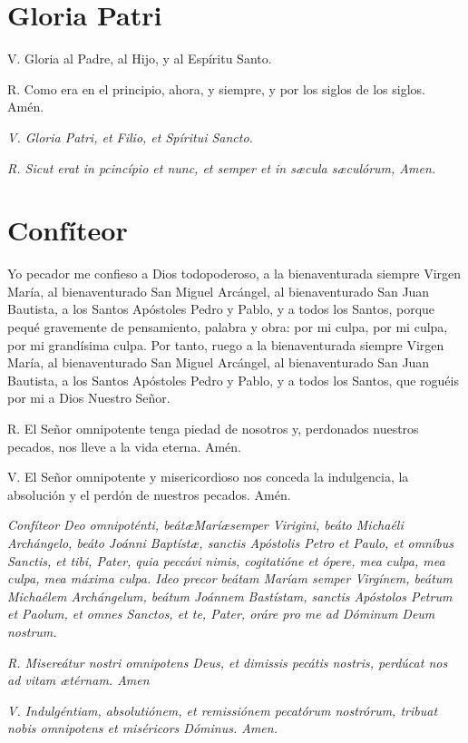 \documentclass[a4paper,11pt, oneside]{report}
\begin{document}
\section*{Gloria Patri}
  {
    V. Gloria al Padre, al Hijo, y al Espíritu Santo.\par
    \indent R. Como era en el principio, ahora, y siempre, y por los siglos de los siglos. Amén.

    \medskip

    \textit{V. Gloria Patri, et Filio, et Spíritui Sancto.}\par
    \indent \textit{R. Sicut erat in pcincípio et nunc, et semper et in s{\ae}cula s{\ae}culórum, Amen.}
  }

\section*{Confíteor}\label{sec:confiteor}
  {
    Yo pecador me confieso a Dios todopoderoso, a la bienaventurada siempre Virgen María, al bienaventurado San Miguel Arcángel,
    al bienaventurado San Juan Bautista, a los Santos Apóstoles Pedro y Pablo, y a todos los Santos, porque pequé gravemente de 
    pensamiento, palabra y obra: por mi culpa, por mi culpa, por mi grandísima culpa. Por tanto, ruego a la bienaventurada siempre
    Virgen María, al bienaventurado San Miguel Arcángel, al bienaventurado San Juan Bautista, a los Santos Apóstoles Pedro y Pablo,
    y a todos los Santos, que roguéis por mi a Dios Nuestro Señor.\par\smallbreak{}
    R. El Señor omnipotente tenga piedad de nosotros y, perdonados nuestros pecados, nos lleve a la vida eterna. Amén.\par\smallbreak{}
    V. El Señor omnipotente y misericordioso nos conceda la indulgencia, la absolución y el perdón de nuestros pecados. Amén.

    \medskip

    \textit{Confíteor Deo omnipoténti, beát\ae Marí\ae semper Virigini, beáto Michaéli Archángelo, beáto Joánni Baptíst\ae, sanctis Apóstolis
    Petro et Paulo, et omníbus Sanctis, et tibi, Pater, quia peccávi nimis, cogitatióne et ópere, mea culpa, mea culpa, mea máxima culpa. Ideo precor
    beátam Maríam semper Virgínem, beátum Michaélem Archángelum, beátum Joánnem Bastístam, sanctis Apóstolos Petrum et Paolum, et omnes
    Sanctos, et te, Pater, oráre pro me ad Dóminum Deum nostrum.}\par\smallbreak{}
    \textit{R. Misereátur nostri omnipotens Deus, et dimissis pecátis nostris, perdúcat nos ad vitam {\ae}térnam. Amen}\par\smallbreak{}
    \textit{V. Indulgéntiam, absolutiónem, et remissiónem pecatórum nostrórum, tribuat nobis omnipotens et miséricors Dóminus. Amen.}
  }
\end{document}
